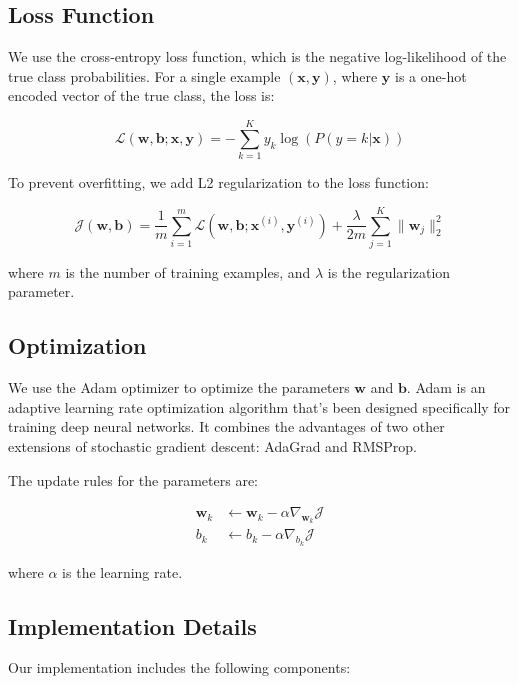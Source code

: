 \documentclass[10pt,journal,compsoc]{IEEEtran}
\begin{document}
\subsection{Loss Function}
We use the cross-entropy loss function, which is the negative log-likelihood of the true class probabilities. For a single example $(\mathbf{x}, \mathbf{y})$, where $\mathbf{y}$ is a one-hot encoded vector of the true class, the loss is:

\begin{equation}
\mathcal{L}(\mathbf{w}, \mathbf{b}; \mathbf{x}, \mathbf{y}) = -\sum_{k=1}^{K} y_k \log(P(y = k | \mathbf{x}))
\end{equation}

To prevent overfitting, we add L2 regularization to the loss function:

\begin{equation}
\mathcal{J}(\mathbf{w}, \mathbf{b}) = \frac{1}{m} \sum_{i=1}^{m} \mathcal{L}(\mathbf{w}, \mathbf{b}; \mathbf{x}^{(i)}, \mathbf{y}^{(i)}) + \frac{\lambda}{2m} \sum_{j=1}^{K} \|\mathbf{w}_j\|_2^2
\end{equation}

where $m$ is the number of training examples, and $\lambda$ is the regularization parameter.

\subsection{Optimization}
We use the Adam optimizer to optimize the parameters \(\mathbf{w}\) and \(\mathbf{b}\). Adam is an adaptive learning rate optimization algorithm that's been designed specifically for training deep neural networks. It combines the advantages of two other extensions of stochastic gradient descent: AdaGrad and RMSProp.

The update rules for the parameters are:

\begin{align}
\mathbf{w}_k &\leftarrow \mathbf{w}_k - \alpha \nabla_{\mathbf{w}_k} \mathcal{J} \\
b_k &\leftarrow b_k - \alpha \nabla_{b_k} \mathcal{J}
\end{align}

where \(\alpha\) is the learning rate.

\subsection{Implementation Details}
Our implementation includes the following components:
\end{document}
